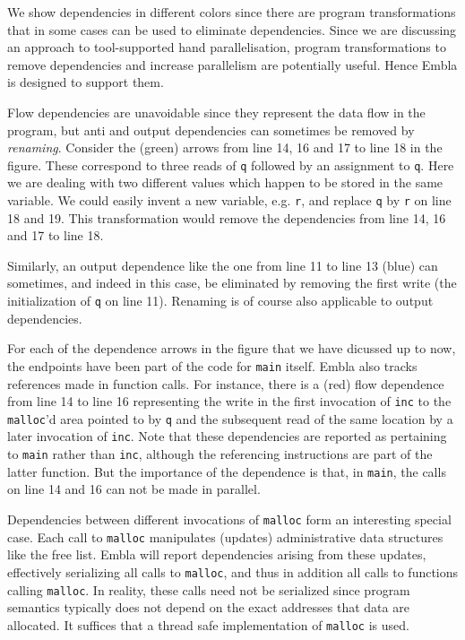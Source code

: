 We show dependencies in different colors since there are program
transformations that in some cases can be used to eliminate 
dependencies. Since we are discussing an approach to tool-supported
hand parallelisation, program transformations to remove dependencies
and increase parallelism are potentially useful. Hence Embla is 
designed to support them.

Flow dependencies are unavoidable since they represent the data flow 
in the program, but anti and output dependencies can sometimes be 
removed by {\em renaming}. Consider the (green) arrows from line 
14, 16 and 17 to line 18 in the figure. These correspond to three
reads of {\tt q} followed by an assignment to {\tt q}. Here we 
are dealing with two different values which happen to be stored 
in the same variable. We could easily invent a new variable, e.g. 
{\tt r}, and replace {\tt q} by {\tt r} on line 18 and 19. This 
transformation would remove the dependencies from line 14, 16 and
17 to line 18. 

Similarly, an output dependence like the one from line 11 to line 13
(blue) can sometimes, and indeed in this case, be eliminated by 
removing the first write (the initialization of {\tt q} on line 11).
Renaming is of course also applicable to output dependencies.

For each of the dependence arrows in the figure that 
we have dicussed up to now, the endpoints have been part of the 
code for {\tt main}
itself. Embla also tracks references made in function calls. For
instance, there is a (red) flow dependence from line 14 to line 16
representing the write in the first invocation of {\tt inc} to the 
{\tt malloc}'d area pointed to by {\tt q} and the subsequent read 
of the same location by a later invocation of {\tt inc}. 
Note that these dependencies 
are reported as pertaining to {\tt main} rather than {\tt inc},
although the referencing instructions are part of the latter function. 
But the importance of the dependence is that, in {\tt main}, the calls
on line 14 and 16 can not be made in parallel.

Dependencies between different invocations of {\tt malloc} form 
an interesting special case.
Each call to {\tt malloc} manipulates (updates) 
administrative data structures like the free list. Embla will
report dependencies arising from these updates, 
effectively serializing all calls to 
{\tt malloc}, and thus in addition all calls to functions calling
{\tt malloc}. In reality, these calls need not be serialized since
program semantics typically does not depend on the exact addresses 
that data are allocated. It suffices that a thread safe 
implementation of {\tt malloc} is used.

